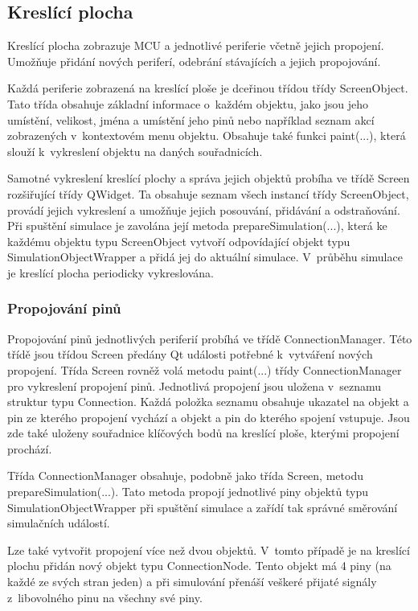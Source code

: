 \subsection{Kreslící plocha}
\label{kreslici_plocha}

Kreslící plocha zobrazuje MCU a jednotlivé periferie včetně jejich propojení. Umožňuje přidání nových periferí, odebrání stávajících a jejich propojování.

Každá periferie zobrazená na kreslící ploše je dceřinou třídou třídy ScreenObject. Tato třída obsahuje základní informace o~každém objektu, jako jsou jeho umístění, velikost, jména a umístění jeho pinů nebo například seznam akcí zobrazených v~kontextovém menu objektu. Obsahuje také funkci paint(...), která slouží k~vykreslení objektu na daných souřadnicích.

Samotné vykreslení kreslící plochy a správa jejich objektů probíha ve třídě Screen rozšiřující třídy QWidget. Ta obsahuje seznam všech instancí třídy ScreenObject, provádí jejich vykreslení a umožňuje jejich posouvání, přidávání a odstraňování. Při spuštění simulace je zavolána její metoda prepareSimulation(...), která ke každému objektu typu ScreenObject vytvoří odpovídající objekt typu SimulationObjectWrapper a přidá jej do aktuální simulace. V~průběhu simulace je kreslící plocha periodicky vykreslována.

\subsubsection{Propojování pinů}

Propojování pinů jednotlivých periferií probíhá ve třídě ConnectionManager. Této třídě jsou třídou Screen předány Qt události potřebné k~vytváření nových propojení. Třída Screen rovněž volá metodu paint(...) třídy ConnectionManager pro vykreslení propojení pinů. Jednotlivá propojení jsou uložena v~seznamu struktur typu Connection. Každá položka seznamu obsahuje ukazatel na objekt a pin ze kterého propojení vychází a objekt a pin do kterého spojení vstupuje. Jsou zde také uloženy souřadnice klíčových bodů na kreslící ploše, kterými propojení prochází.

Třída ConnectionManager obsahuje, podobně jako třída Screen, metodu prepareSimulation(...). Tato metoda propojí jednotlivé piny objektů typu SimulationObjectWrapper při spuštění simulace a zařídí tak správné směrování simulačních událostí.

Lze také vytvořit propojení více než dvou objektů. V~tomto případě je na kreslící plochu přidán nový objekt typu ConnectionNode. Tento objekt má 4 piny (na každé ze svých stran jeden) a při simulování přenáší veškeré přijaté signály z~libovolného pinu na všechny své piny.

